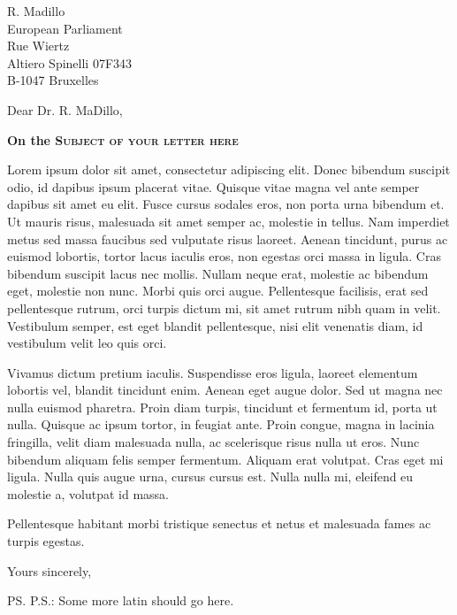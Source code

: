 \documentclass[a4paper,10pt]{letter}
\begin{document}
\begin{letter}{
    R. Madillo\\
    European Parliament\\
    Rue Wiertz\\
    Altiero Spinelli 07F343\\
    B-1047 Bruxelles 
  }
  \opening{Dear Dr. R. MaDillo,}

  \begin{center}
    \textbf{On the \textsc{Subject of your letter here}}
  \end{center}

  Lorem ipsum dolor sit amet, consectetur adipiscing elit. Donec bibendum 
  suscipit odio, id dapibus ipsum placerat vitae. Quisque vitae magna vel ante 
  semper dapibus sit amet eu elit. Fusce cursus sodales eros, non porta urna 
  bibendum et. Ut mauris risus, malesuada sit amet semper ac, molestie in 
  tellus. Nam imperdiet metus sed massa faucibus sed vulputate risus laoreet. 
  Aenean tincidunt, purus ac euismod lobortis, tortor lacus iaculis eros, non 
  egestas orci massa in ligula. Cras bibendum suscipit lacus nec mollis. Nullam 
  neque erat, molestie ac bibendum eget, molestie non nunc. Morbi quis orci 
  augue. Pellentesque facilisis, erat sed pellentesque rutrum, orci turpis 
  dictum mi, sit amet rutrum nibh quam in velit. Vestibulum semper, est eget 
  blandit pellentesque, nisi elit venenatis diam, id vestibulum velit leo quis 
  orci. 
  
  Vivamus dictum pretium iaculis. Suspendisse eros ligula, laoreet 
  elementum lobortis vel, blandit tincidunt enim. Aenean eget augue dolor. Sed 
  ut magna nec nulla euismod pharetra. Proin diam turpis, tincidunt et fermentum 
  id, porta ut nulla. Quisque ac ipsum tortor, in feugiat ante. Proin congue, 
  magna in lacinia fringilla, velit diam malesuada nulla, ac scelerisque risus 
  nulla ut eros. Nunc bibendum aliquam felis semper fermentum. Aliquam erat 
  volutpat. Cras eget mi ligula. Nulla quis augue urna, cursus cursus est. Nulla 
  nulla mi, eleifend eu molestie a, volutpat id massa. 
  
  Pellentesque habitant morbi tristique senectus et netus et malesuada fames ac 
  turpis egestas.

  \closing{Yours sincerely,}

  \ps{P.S.: Some more latin should go here.}
\end{letter}
\end{document}

